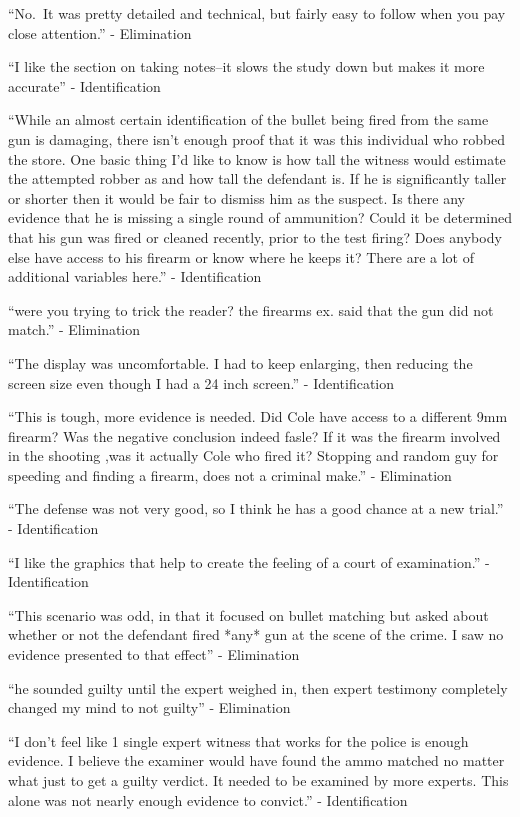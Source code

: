 \documentclass[print]{nuthesis}
\begin{document}
``No.~It was pretty detailed and technical, but fairly easy to follow when you pay close attention.'' - Elimination

``I like the section on taking notes--it slows the study down but makes it more accurate'' - Identification

``While an almost certain identification of the bullet being fired from the same gun is damaging, there isn't enough proof that it was this individual who robbed the store. One basic thing I'd like to know is how tall the witness would estimate the attempted robber as and how tall the defendant is. If he is significantly taller or shorter then it would be fair to dismiss him as the suspect. Is there any evidence that he is missing a single round of ammunition? Could it be determined that his gun was fired or cleaned recently, prior to the test firing? Does anybody else have access to his firearm or know where he keeps it? There are a lot of additional variables here.'' - Identification

``were you trying to trick the reader? the firearms ex. said that the gun did not match.'' - Elimination

``The display was uncomfortable. I had to keep enlarging, then reducing the screen size even though I had a 24 inch screen.'' - Identification

``This is tough, more evidence is needed. Did Cole have access to a different 9mm firearm? Was the negative conclusion indeed fasle? If it was the firearm involved in the shooting ,was it actually Cole who fired it? Stopping and random guy for speeding and finding a firearm, does not a criminal make.'' - Elimination

``The defense was not very good, so I think he has a good chance at a new trial.'' - Identification

``I like the graphics that help to create the feeling of a court of examination.'' - Identification

``This scenario was odd, in that it focused on bullet matching but asked about whether or not the defendant fired *any* gun at the scene of the crime. I saw no evidence presented to that effect'' - Elimination

``he sounded guilty until the expert weighed in, then expert testimony completely changed my mind to not guilty'' - Elimination

``I don't feel like 1 single expert witness that works for the police is enough evidence. I believe the examiner would have found the ammo matched no matter what just to get a guilty verdict. It needed to be examined by more experts. This alone was not nearly enough evidence to convict.'' - Identification
\end{document}
